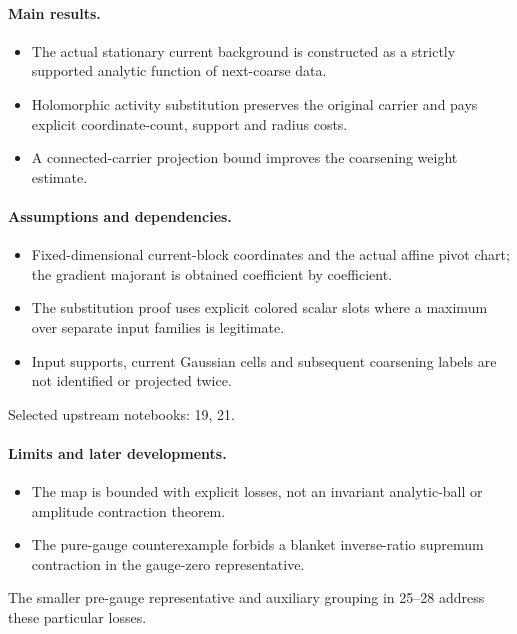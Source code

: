 \paragraph{Main results.}
\begin{itemize}
\item The actual stationary current background is constructed as a strictly supported analytic function of next-coarse data.
\item Holomorphic activity substitution preserves the original carrier and pays explicit coordinate-count, support and radius costs.
\item A connected-carrier projection bound improves the coarsening weight estimate.
\end{itemize}

\paragraph{Assumptions and dependencies.}
\begin{itemize}
\item Fixed-dimensional current-block coordinates and the actual affine pivot chart; the gradient majorant is obtained coefficient by coefficient.
\item The substitution proof uses explicit colored scalar slots where a maximum over separate input families is legitimate.
\item Input supports, current Gaussian cells and subsequent coarsening labels are not identified or projected twice.
\end{itemize}

Selected upstream notebooks: 19, 21.\par

\paragraph{Limits and later developments.}
\begin{itemize}
\item The map is bounded with explicit losses, not an invariant analytic-ball or amplitude contraction theorem.
\item The pure-gauge counterexample forbids a blanket inverse-ratio supremum contraction in the gauge-zero representative.
\end{itemize}

The smaller pre-gauge representative and auxiliary grouping in 25--28 address these particular losses.

